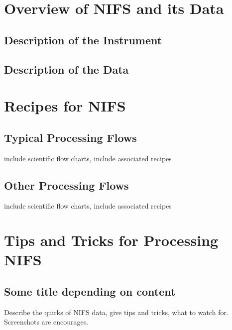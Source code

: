 \documentclass[letterpaper,10pt,english]{sphinxmanual}
\begin{document}
\section{Overview of NIFS and its Data}
\label{NIFS/instrument:nifs-instrument-overview}\label{NIFS/instrument:overview-of-nifs-and-its-data}\label{NIFS/instrument::doc}

\subsection{Description of the Instrument}
\label{NIFS/instrument:description-of-the-instrument}

\subsection{Description of the Data}
\label{NIFS/instrument:description-of-the-data}

\section{Recipes for NIFS}
\label{NIFS/recipes:nifs-recipes-and-flows}\label{NIFS/recipes::doc}\label{NIFS/recipes:recipes-for-nifs}

\subsection{Typical Processing Flows}
\label{NIFS/recipes:typical-processing-flows}
include scientific flow charts, include associated recipes


\subsection{Other Processing Flows}
\label{NIFS/recipes:other-processing-flows}
include scientific flow charts, include associated recipes


\section{Tips and Tricks for Processing NIFS}
\label{NIFS/tipstricks:tips-and-tricks-for-processing-nifs}\label{NIFS/tipstricks:nifs-tips-tricks}\label{NIFS/tipstricks::doc}

\subsection{Some title depending on content}
\label{NIFS/tipstricks:some-title-depending-on-content}
Describe the quirks of NIFS data, give tips
and tricks, what to watch for.  Screenshots are encourages.
\end{document}
